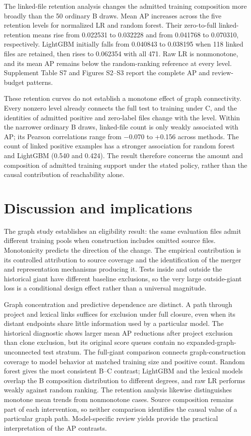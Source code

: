 \documentclass[preprint,12pt]{elsarticle}
\begin{document}
The linked-file retention analysis changes the admitted training composition more broadly than the 50 ordinary B draws. Mean AP increases across the five retention levels for normalized LR and random forest. Their zero-to-full linked-retention means rise from 0.022531 to 0.032228 and from 0.041768 to 0.070310, respectively. LightGBM initially falls from 0.040843 to 0.038195 when 118 linked files are retained, then rises to 0.062354 with all 471. Raw LR is nonmonotone, and its mean AP remains below the random-ranking reference at every level. Supplement Table S7 and Figures S2--S3 report the complete AP and review-budget patterns.

These retention curves do not establish a monotone effect of graph connectivity. Every nonzero level already connects the full test to training under C, and the identities of admitted positive and zero-label files change with the level. Within the narrower ordinary B draws, linked-file count is only weakly associated with AP; its Pearson correlations range from −0.070 to +0.156 across methods. The count of linked positive examples has a stronger association for random forest and LightGBM (0.540 and 0.424). The result therefore concerns the amount and composition of admitted training support under the stated policy, rather than the causal contribution of reachability alone.

\section{Discussion and implications}\label{discussion-and-implications}

The graph study establishes an eligibility result: the same evaluation files admit different training pools when construction includes omitted source files. Monotonicity predicts the direction of the change. The empirical contribution is its controlled attribution to source coverage and the identification of the merger and representation mechanisms producing it. Tests inside and outside the historical giant have different baseline exclusions, so the very large outside-giant loss is a conditional design effect rather than a universal magnitude.

Graph concentration and predictive dependence are distinct. A path through project and lexical links suffices for exclusion under full closure, even when its distant endpoints share little information used by a particular model. The historical diagnostic shows larger mean AP reductions after project exclusion than clone exclusion, but its original score queues contain no expanded-graph-unconnected test stratum. The full-giant comparison connects graph-construction coverage to model behavior at matched training size and positive count. Random forest gives the most consistent B--C contrast; LightGBM and the lexical models overlap the B composition distribution to different degrees, and raw LR performs weakly against random ranking. The retention analysis likewise distinguishes monotone mean trends from nonmonotone cases. Source composition remains part of each intervention, so neither comparison identifies the causal value of a particular graph path. Model-specific review yields provide the practical interpretation of the AP contrasts.
\end{document}
